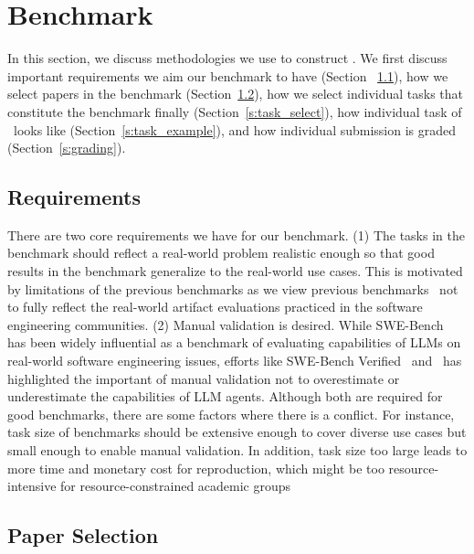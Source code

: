 \section{Benchmark}
\label{s:benchmark}

In this section, we discuss methodologies we use to construct \benchmark.
We first discuss important requirements we aim our benchmark to have (Section ~\ref{s:requirements}), how we select papers in the benchmark (Section~\ref{s:paper_select}), how we select individual tasks that constitute the benchmark finally (Section~\ref{s:task_select}), how individual task of \benchmark~looks like (Section~\ref{s:task_example}), and how individual submission is graded (Section~\ref{s:grading}).

\subsection{Requirements}
\label{s:requirements}

There are two core requirements we have for our benchmark.
(1) The tasks in the benchmark should reflect a real-world problem realistic enough so that good results in the benchmark generalize to the real-world use cases.
This is motivated by limitations of the previous benchmarks as we view previous benchmarks~\cite{DBLP:conf/emnlp/BoginYG0BCSK24, DBLP:journals/tmlr/SiegelKNSN24, DBLP:conf/acl/HuZLWPK25} not to fully reflect the real-world artifact evaluations practiced in the software engineering communities.
(2) Manual validation is desired. While SWE-Bench~\cite{jimenez2024swebench} has been widely influential as a benchmark of evaluating capabilities of LLMs on real-world software engineering issues, efforts like SWE-Bench Verified~\cite{chowdhury2024swebenchverified} and~\cite{DBLP:journals/corr/abs-2503-15223} has highlighted the important of manual validation not to overestimate or underestimate the capabilities of LLM agents.
Although both are required for good benchmarks, there are some factors where there is a conflict.
For instance, task size of benchmarks should be extensive enough to cover diverse use cases but small enough to enable manual validation.
In addition, task size too large leads to more time and monetary cost for reproduction, which might be too resource-intensive for resource-constrained academic groups~\cite{DBLP:conf/iclr/ChanCJASMSLMPMW25}

\subsection{Paper Selection}
\label{s:paper_select}


